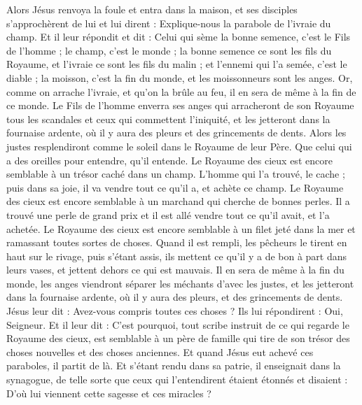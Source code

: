 \begin{multicols}{2}
{
Alors Jésus renvoya la foule et entra dans la maison, et ses disciples s’approchèrent de lui et lui dirent : Explique-nous la parabole de l'ivraie du champ.
Et il leur répondit et dit : Celui qui sème la bonne semence, c'est le Fils de l'homme ;
le champ, c'est le monde ; la bonne semence ce sont les fils du Royaume, et l'ivraie ce sont les fils du malin ;
et l'ennemi qui l'a semée, c'est le diable ; la moisson, c'est la fin du monde, et les moissonneurs sont les anges.
Or, comme on arrache l'ivraie, et qu’on la brûle au feu, il en sera de même à la fin de ce monde.
Le Fils de l'homme enverra ses anges qui arracheront de son Royaume tous les scandales et ceux qui commettent l'iniquité,
et les jetteront dans la fournaise ardente, où il y aura des pleurs et des grincements de dents.
Alors les justes resplendiront comme le soleil dans le Royaume de leur Père. Que celui qui a des oreilles pour entendre, qu'il entende.
Le Royaume des cieux est encore semblable à un trésor caché dans un champ. L’homme qui l’a trouvé, le cache ; puis dans sa joie, il va vendre tout ce qu'il a, et achète ce champ.
Le Royaume des cieux est encore semblable à un marchand qui cherche de bonnes perles.
Il a trouvé une perle de grand prix et il est allé vendre tout ce qu'il avait, et l'a achetée.
Le Royaume des cieux est encore semblable à un filet jeté dans la mer et ramassant toutes sortes de choses.
Quand il est rempli, les pêcheurs le tirent en haut sur le rivage, puis s'étant assis, ils mettent ce qu'il y a de bon à part dans leurs vases, et jettent dehors ce qui est mauvais.
Il en sera de même à la fin du monde, les anges viendront séparer les méchants d'avec les justes,
et les jetteront dans la fournaise ardente, où il y aura des pleurs, et des grincements de dents.
Jésus leur dit : Avez-vous compris toutes ces choses ? Ils lui répondirent : Oui, Seigneur.
Et il leur dit : C’est pourquoi, tout scribe instruit de ce qui regarde le Royaume des cieux, est semblable à un père de famille qui tire de son trésor des choses nouvelles et des choses anciennes.
Et quand Jésus eut achevé ces paraboles, il partit de là.
Et s’étant rendu dans sa patrie, il enseignait dans la synagogue, de telle sorte que ceux qui l’entendirent étaient étonnés et disaient : D’où lui viennent cette sagesse et ces miracles ?
}
\end{multicols}
